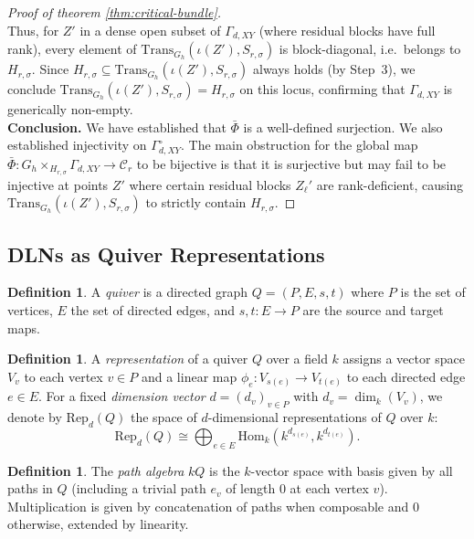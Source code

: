\documentclass{article}
\theoremstyle{definition}
\newtheorem{definition}[theorem]{Definition}
\begin{document}
\begin{proof}[Proof of theorem \ref{thm:critical-bundle}]
\noindent
\\
Thus, for $Z'$ in a dense open subset of $\Gamma_{d,XY}$ (where residual blocks have full rank), every element of $\mathrm{Trans}_{G_h}(\iota(Z'), S_{r,\sigma})$ is block-diagonal, i.e.\ belongs to $H_{r,\sigma}$.  Since $H_{r,\sigma} \subseteq \mathrm{Trans}_{G_h}(\iota(Z'), S_{r,\sigma})$ always holds (by Step~3), we conclude $\mathrm{Trans}_{G_h}(\iota(Z'), S_{r,\sigma}) = H_{r,\sigma}$ on this locus, confirming that $\Gamma_{d,XY}$ is generically non-empty.
\\
\noindent
\textbf{Conclusion.}
We have established that $\bar\Phi$ is a well-defined surjection.  We also established injectivity on $\Gamma_{d,XY}^{\circ}$. The main obstruction for the global map $\bar\Phi \colon G_h \times_{H_{r,\sigma}} \Gamma_{d,XY} \to \mathcal{C}_r$ to be bijective is that it is surjective but may fail to be injective at points $Z'$ where certain residual blocks $Z_\ell'$ are rank-deficient, causing $\mathrm{Trans}_{G_h}(\iota(Z'), S_{r,\sigma})$ to strictly contain $H_{r,\sigma}$.
\end{proof}

\subsection*{DLNs as Quiver Representations}
\begin{definition}
A \emph{quiver} is a directed graph $Q = (P, E, s, t)$ where $P$ is the set of vertices, $E$ the set of directed edges, and $s,t: E \to P$ are the source and target maps.
\end{definition}

\begin{definition}
A \emph{representation} of a quiver $Q$ over a field $k$ assigns a vector space $V_v$ to each vertex $v \in P$ and a linear map $\phi_e : V_{s(e)} \to V_{t(e)}$ to each directed edge $e \in E$.  
For a fixed \emph{dimension vector} $d = (d_v)_{v \in P}$ with $d_v = \dim_k(V_v)$, we denote by $\mathrm{Rep}_d(Q)$ the space of $d$-dimensional representations of $Q$ over $k$:
\[
    \mathrm{Rep}_d(Q) \cong \bigoplus_{e \in E} \mathrm{Hom}_k(k^{d_{s(e)}}, k^{d_{t(e)}}).
\]
\end{definition}

\begin{definition}
The \emph{path algebra} $kQ$ is the $k$-vector space with basis given by all paths in $Q$ (including a trivial path $e_v$ of length $0$ at each vertex $v$). Multiplication is given by concatenation of paths when composable and $0$ otherwise, extended by linearity.
\end{definition}
\end{document}
